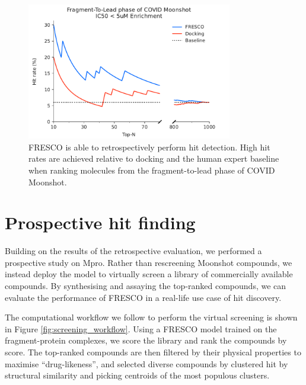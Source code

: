 \begin{figure}[th]
    \centering
    \includegraphics[width=0.8\textwidth]{Chapters/Fresco/Figs/fresco_vs_moonshot_break_5uM.pdf}
    \caption{FRESCO is able to retrospectively perform hit detection. High hit rates are achieved relative to docking and the human expert baseline when ranking molecules from the fragment-to-lead phase of COVID Moonshot.}
    \label{fig:moonshot_enrichment_vs_docking}
\end{figure}

\section{Prospective hit finding} \label{sec:prospective}

Building on the results of the retrospective evaluation, we performed a prospective study on Mpro. Rather than rescreening Moonshot compounds, we instead deploy the model to virtually screen a library of commercially available compounds. By synthesising and assaying the top-ranked compounds, we can evaluate the performance of FRESCO in a real-life use case of hit discovery.

The computational workflow we follow to perform the virtual screening is shown in Figure \ref{fig:screening_workflow}. Using a FRESCO model trained on the fragment-protein complexes, we score the library and rank the compounds by score. The top-ranked compounds are then filtered by their physical properties to maximise ``drug-likeness'', and selected diverse compounds by clustered hit by structural similarity and picking centroids of the most populous clusters.

